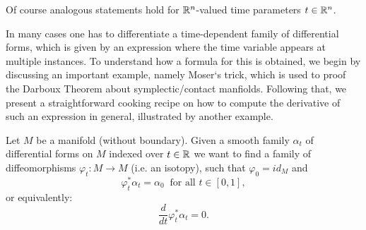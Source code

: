 \begin{remark}
    Of course analogous statements hold for $\mathbb{R}^n$-valued time parameters $t\in\mathbb{R}^n$.
\end{remark}


In many cases one has to differentiate a time-dependent family of differential forms, which is given by an expression where the time variable appears at multiple instances. To understand how a formula for this is obtained, we begin by discussing an important example, namely Moser`s trick, which is used to proof the Darboux Theorem about symplectic/contact manfiolds. Following that, we present a straightforward cooking recipe on how to compute the derivative of such an expression in general, illustrated by another example.

Let $M$ be a manifold (without boundary). Given a smooth family $\alpha_t$ of differential forms on $M$ indexed over $t \in \mathbb{R}$ we want to find a family of diffeomorphisms $\varphi_t \colon M \to M$ (i.e. an isotopy), such that $\varphi_0 = id_M$ and 
\[
    \varphi_t^\ast \alpha_t = \alpha_0 \: \text{ for all } t \in [0,1],
\]
or equivalently:
\begin{equation}
    \label{eq:mosers_trick}
    \frac{d}{dt} \varphi_t^\ast \alpha_t = 0.    
\end{equation}



